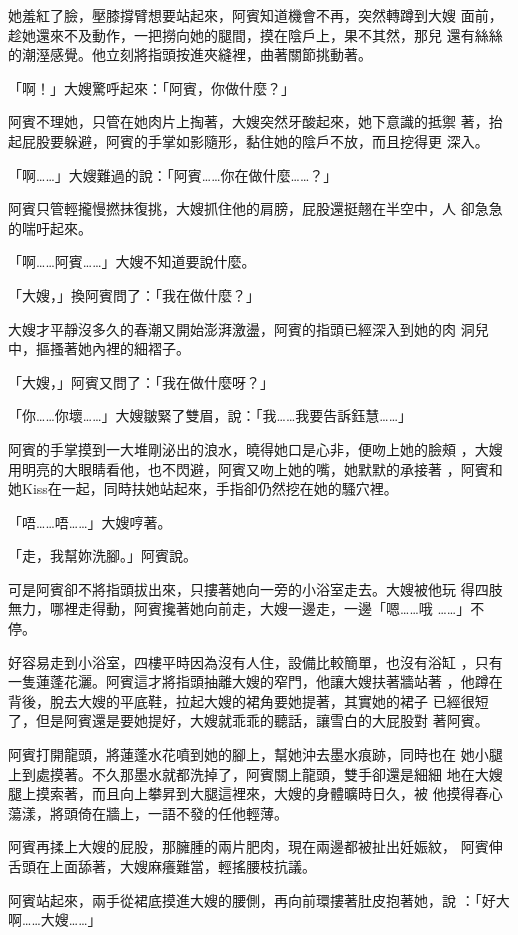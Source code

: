 她羞紅了臉，壓膝撐臂想要站起來，阿賓知道機會不再，突然轉蹲到大嫂
面前，趁她還來不及動作，一把撈向她的腿間，摸在陰戶上，果不其然，那兒
還有絲絲的潮溼感覺。他立刻將指頭按進夾縫裡，曲著關節挑動著。

「啊！」大嫂驚呼起來：「阿賓，你做什麼？」

阿賓不理她，只管在她肉片上掏著，大嫂突然牙酸起來，她下意識的抵禦
著，抬起屁股要躲避，阿賓的手掌如影隨形，黏住她的陰戶不放，而且挖得更
深入。

「啊……」大嫂難過的說：「阿賓……你在做什麼……？」

阿賓只管輕攏慢撚抹復挑，大嫂抓住他的肩膀，屁股還挺翹在半空中，人
卻急急的喘吁起來。

「啊……阿賓……」大嫂不知道要說什麼。

「大嫂，」換阿賓問了：「我在做什麼？」

大嫂才平靜沒多久的春潮又開始澎湃激盪，阿賓的指頭已經深入到她的肉
洞兒中，摳搔著她內裡的細褶子。

「大嫂，」阿賓又問了：「我在做什麼呀？」

「你……你壞……」大嫂皺緊了雙眉，說：「我……我要告訴鈺慧……」

阿賓的手掌摸到一大堆剛泌出的浪水，曉得她口是心非，便吻上她的臉頰
，大嫂用明亮的大眼睛看他，也不閃避，阿賓又吻上她的嘴，她默默的承接著
，阿賓和她Kiss在一起，同時扶她站起來，手指卻仍然挖在她的騷穴裡。

「唔……唔……」大嫂哼著。

「走，我幫妳洗腳。」阿賓說。

可是阿賓卻不將指頭拔出來，只摟著她向一旁的小浴室走去。大嫂被他玩
得四肢無力，哪裡走得動，阿賓攙著她向前走，大嫂一邊走，一邊「嗯……哦
……」不停。

好容易走到小浴室，四樓平時因為沒有人住，設備比較簡單，也沒有浴缸
，只有一隻蓮蓬花灑。阿賓這才將指頭抽離大嫂的窄門，他讓大嫂扶著牆站著
，他蹲在背後，脫去大嫂的平底鞋，拉起大嫂的裙角要她提著，其實她的裙子
已經很短了，但是阿賓還是要她提好，大嫂就乖乖的聽話，讓雪白的大屁股對
著阿賓。

阿賓打開龍頭，將蓮蓬水花噴到她的腳上，幫她沖去墨水痕跡，同時也在
她小腿上到處摸著。不久那墨水就都洗掉了，阿賓關上龍頭，雙手卻還是細細
地在大嫂腿上摸索著，而且向上攀昇到大腿這裡來，大嫂的身體曠時日久，被
他摸得春心蕩漾，將頭倚在牆上，一語不發的任他輕薄。

阿賓再揉上大嫂的屁股，那臃腫的兩片肥肉，現在兩邊都被扯出妊娠紋，
阿賓伸舌頭在上面舔著，大嫂麻癢難當，輕搖腰枝抗議。

阿賓站起來，兩手從裙底摸進大嫂的腰側，再向前環摟著肚皮抱著她，說
：「好大啊……大嫂……」

